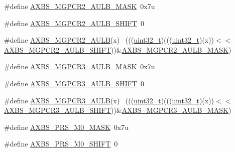\begin{DoxyCompactItemize}
\item 
\#define \hyperlink{group___a_x_b_s___register___masks_ga454fa34b9ad3a689e961506a253e3775}{A\+X\+B\+S\+\_\+\+M\+G\+P\+C\+R2\+\_\+\+A\+U\+L\+B\+\_\+\+M\+A\+SK}~0x7u
\item 
\#define \hyperlink{group___a_x_b_s___register___masks_ga0e4aa4214fd104e88a02473e0bf30c7f}{A\+X\+B\+S\+\_\+\+M\+G\+P\+C\+R2\+\_\+\+A\+U\+L\+B\+\_\+\+S\+H\+I\+FT}~0
\item 
\#define \hyperlink{group___a_x_b_s___register___masks_ga917672f09d862ed9ebb0c5419c7f983a}{A\+X\+B\+S\+\_\+\+M\+G\+P\+C\+R2\+\_\+\+A\+U\+LB}(x)                                        ~(((\hyperlink{_p_e___types_8h_a33594304e786b158f3fb30289278f5af}{uint32\+\_\+t})(((\hyperlink{_p_e___types_8h_a33594304e786b158f3fb30289278f5af}{uint32\+\_\+t})(x))$<$$<$\hyperlink{group___a_x_b_s___register___masks_ga0e4aa4214fd104e88a02473e0bf30c7f}{A\+X\+B\+S\+\_\+\+M\+G\+P\+C\+R2\+\_\+\+A\+U\+L\+B\+\_\+\+S\+H\+I\+FT}))\&\hyperlink{group___a_x_b_s___register___masks_ga454fa34b9ad3a689e961506a253e3775}{A\+X\+B\+S\+\_\+\+M\+G\+P\+C\+R2\+\_\+\+A\+U\+L\+B\+\_\+\+M\+A\+SK})
\item 
\#define \hyperlink{group___a_x_b_s___register___masks_ga32728cb5c7a9e5bb1d40e3ae1842fa33}{A\+X\+B\+S\+\_\+\+M\+G\+P\+C\+R3\+\_\+\+A\+U\+L\+B\+\_\+\+M\+A\+SK}~0x7u
\item 
\#define \hyperlink{group___a_x_b_s___register___masks_gad9320811473f8962f040b6f8bb2b2bf8}{A\+X\+B\+S\+\_\+\+M\+G\+P\+C\+R3\+\_\+\+A\+U\+L\+B\+\_\+\+S\+H\+I\+FT}~0
\item 
\#define \hyperlink{group___a_x_b_s___register___masks_ga6964b690c17128a29a6160a2b1f3b676}{A\+X\+B\+S\+\_\+\+M\+G\+P\+C\+R3\+\_\+\+A\+U\+LB}(x)                                        ~(((\hyperlink{_p_e___types_8h_a33594304e786b158f3fb30289278f5af}{uint32\+\_\+t})(((\hyperlink{_p_e___types_8h_a33594304e786b158f3fb30289278f5af}{uint32\+\_\+t})(x))$<$$<$\hyperlink{group___a_x_b_s___register___masks_gad9320811473f8962f040b6f8bb2b2bf8}{A\+X\+B\+S\+\_\+\+M\+G\+P\+C\+R3\+\_\+\+A\+U\+L\+B\+\_\+\+S\+H\+I\+FT}))\&\hyperlink{group___a_x_b_s___register___masks_ga32728cb5c7a9e5bb1d40e3ae1842fa33}{A\+X\+B\+S\+\_\+\+M\+G\+P\+C\+R3\+\_\+\+A\+U\+L\+B\+\_\+\+M\+A\+SK})
\item 
\#define \hyperlink{group___a_x_b_s___register___masks_ga9e794f0ace10f0e077a92ce9f5abbb41}{A\+X\+B\+S\+\_\+\+P\+R\+S\+\_\+\+M0\+\_\+\+M\+A\+SK}~0x7u
\item 
\#define \hyperlink{group___a_x_b_s___register___masks_ga86a8f40f6a5d45cd4868dce4833a17d5}{A\+X\+B\+S\+\_\+\+P\+R\+S\+\_\+\+M0\+\_\+\+S\+H\+I\+FT}~0

\end{DoxyCompactItemize}
